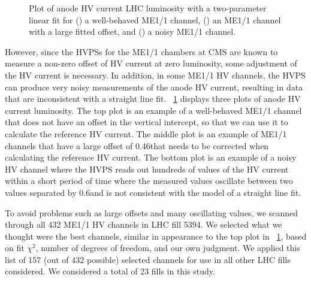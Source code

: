 \begin{figure}
  \caption[Plot of anode HV current \vs LHC luminosity with a two-parameter linear fit for three ME1/1 channels.]{Plot of anode HV current \vs LHC luminosity with a two-parameter linear fit for () a well-behaved ME1/1 channel, () an ME1/1 channel with a large fitted offset, and () a noisy ME1/1 channel.}
	\label{fig:ME11_IvsL}
\end{figure}

However, since the HVPSs for the ME1/1 chambers at CMS are known to measure a non-zero offset of HV current at zero luminosity, some adjustment of the HV current is necessary. In addition, in some ME1/1 HV channels, the HVPS can produce very noisy measurements of the anode HV current, resulting in data that are inconsistent with a straight line fit. \Fig~\ref{fig:ME11_IvsL} displays three plots of anode HV current \vs luminosity. The top plot is an example of a well-behaved ME1/1 channel that does not have an offset in the vertical intercept, so that we can use it to calculate the reference HV current. The middle plot is an example of ME1/1 channels that have a large offset of 0.46\muA that needs to be corrected when calculating the reference HV current. The bottom plot is an example of a noisy HV channel where the HVPS reads out hundreds of values of the HV current within a short period of time where the measured values oscillate between two values separated by 0.6\muA and is not consistent with the model of a straight line fit.

To avoid problems such as large offsets and many oscillating values, we scanned through all 432 ME1/1 HV channels in LHC fill 5394. We selected what we thought were the best channels, similar in appearance to the top plot in \FigDot~\ref{fig:ME11_IvsL}, based on fit $\chi^{2}$, number of degrees of freedom, and our own judgment. We applied this list of 157 (out of 432 possible) selected channels for use in all other LHC fills considered. We considered a total of 23 fills in this study. 

